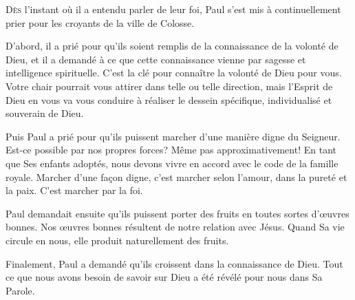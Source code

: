 \dvrule







\lettrine{D}{ès} l'instant où il a entendu parler de leur foi,
 Paul s'est mis à continuellement prier pour les croyants de la ville de Colosse. 

D'abord, il a prié pour qu'ils soient remplis de la connaissance
 de la volonté de Dieu, et il a demandé à ce que cette connaissance vienne
 par sagesse et intelligence spirituelle.
 C'est la clé pour connaître la volonté de Dieu pour vous.
 Votre chair pourrait vous attirer dans telle ou telle direction,
 mais l'Esprit de Dieu en vous va vous conduire à réaliser
 le dessein spécifique, individualisé et souverain de Dieu.


Puis Paul a prié pour qu'ils puissent marcher d'une manière digne du Seigneur.
 Est-ce possible par nos propres forces? Même pas approximativement!
 En tant que Ses enfants adoptés, nous devons vivre en accord
 avec le code de la famille royale. Marcher d'une fa\c{c}on digne,
 c'est marcher selon l'amour, dans la pureté et la paix.
 C'est marcher par la foi.

Paul demandait ensuite qu'ils puissent porter des fruits en toutes sortes
 d'\oe{}uvres bonnes. Nos \oe{}uvres bonnes résultent de notre relation avec Jésus.
 Quand Sa vie circule en nous, elle produit naturellement des fruits.

Finalement, Paul a demandé qu'ils croissent dans la connaissance de Dieu.
 Tout ce que nous avons besoin de savoir sur Dieu a été révélé
 pour nous dans Sa Parole.


